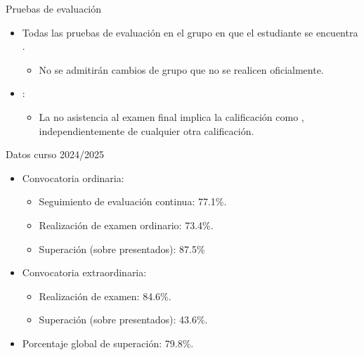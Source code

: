 \begin{frame}[t]{Pruebas de evaluación}
\begin{itemize}
  \item Todas las pruebas de evaluación  
        en el grupo en que el estudiante se encuentra .
    \begin{itemize}
      \item No se admitirán cambios de grupo que no se realicen oficialmente.
    \end{itemize}

  \item {}:   
\begin{itemize}
      \item La no asistencia al examen final 
            implica la calificación como , 
            independientemente de cualquier otra calificación.
    \end{itemize}
\end{itemize}
\end{frame}

\begin{frame}[t]{Datos curso 2024/2025}
\begin{itemize}
  \item Convocatoria ordinaria:
    \begin{itemize}
      \item Seguimiento de evaluación continua: 77.1\%.
      \item Realización de examen ordinario: 73.4\%.
      \item Superación (sobre presentados): 87.5\% 
    \end{itemize}

  \item Convocatoria extraordinaria:
    \begin{itemize}
      \item Realización de examen: 84.6\%.
      \item Superación (sobre presentados): 43.6\%.
    \end{itemize}

  \item Porcentaje global de superación: 79.8\%.
\end{itemize}
\end{frame}
